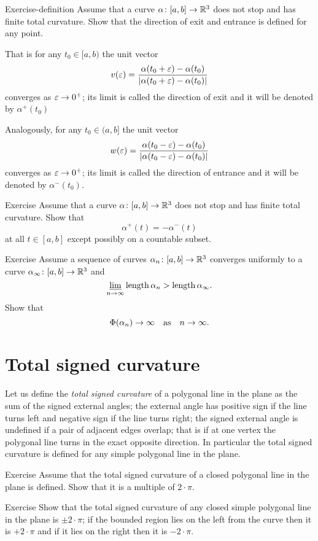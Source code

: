 \begin{thm}{Exercise-definition} 
Assume that a curve $\alpha\colon[a,b]\to\mathbb{R}^3$ does not stop and has finite total curvature.
Show that the direction of exit and entrance is defined for any point.

That is for any $t_0\in [a,b)$ the unit vector  
\[v(\varepsilon)=\frac{\alpha(t_0+\varepsilon)-\alpha(t_0)}{|\alpha(t_0+\varepsilon)-\alpha(t_0)|}\] converges as $\varepsilon\to0^+$;
its limit is called the direction of exit and it will be denoted by $\alpha^+(t_0)$

Analogously, for any $t_0\in (a,b]$ the unit vector  
\[w(\varepsilon)=\frac{\alpha(t_0-\varepsilon)-\alpha(t_0)}{|\alpha(t_0-\varepsilon)-\alpha(t_0)|}\] 
converges as $\varepsilon\to0^+$;
its limit is called the direction of entrance and it will be denoted by $\alpha^-(t_0)$.
\end{thm}

\begin{thm}{Exercise} 
Assume that a curve $\alpha\colon[a,b]\to\mathbb{R}^3$ does not stop and has finite total curvature.
Show that 
\[\alpha^+(t)=-\alpha^-(t)\]
at all $t\in[a,b]$ except possibly on a countable subset.
\end{thm}

\begin{thm}{Exercise} 
Assume a sequence of curves $\alpha_n\colon[a,b]\to\mathbb{R}^3$ converges uniformly to a curve $\alpha_\infty\colon[a,b]\to\mathbb{R}^3$ and
\[ \varliminf_{n\to\infty}\mathop{\rm length}\nolimits\alpha_n>\mathop{\rm length}\nolimits\alpha_\infty.\]
Show that 
\[\Phi({\alpha_n})\to\infty\quad\text{as}\quad n\to\infty.\]

\end{thm}


\section{Total signed curvature}

Let us define the \emph{total signed curvature} of a polygonal line in the plane as the sum of the signed external angles;
the external angle has positive sign if the line turns left and negative sign if the line turns right; the signed external angle is undefined if a pair of adjacent edges overlap;
that is if at one vertex the polygonal line turns in the exact opposite direction.
In particular the total signed curvature is defined for any simple polygonal line in the plane.

\begin{thm}{Exercise}\label{ex:2kpi}
Assume that the total signed curvature of a closed polygonal line in the plane is defined.
Show that it is a multiple of $2\cdot\pi$.
\end{thm}


\begin{thm}{Exercise}\label{ex:pm2pi}
Show that the total signed curvature of any closed simple polygonal line in the plane is $\pm2\cdot\pi$; 
if the bounded region lies on the left from the curve then it is $+2\cdot\pi$ and if it lies on the right then it is $-2\cdot\pi$.
\end{thm}
